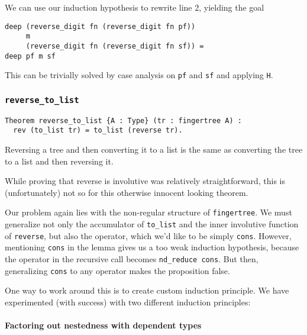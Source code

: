 \documentclass{article}
\newcommand{\code}[1]{\texttt{#1}}
\begin{document}
We can use our induction hypothesis to rewrite line 2, yielding the goal
\begin{verbatim}
deep (reverse_digit fn (reverse_digit fn pf))
     m
     (reverse_digit fn (reverse_digit fn sf)) =
deep pf m sf
\end{verbatim}

This can be trivially solved by case analysis on \code{pf} and \code{sf}
and applying \code{H}.

\subsubsection{\code{reverse\_to\_list}}
\begin{listing}[H]
\begin{verbatim}
Theorem reverse_to_list {A : Type} (tr : fingertree A) :
  rev (to_list tr) = to_list (reverse tr).
\end{verbatim}
\caption{Reversing a tree and then converting it to a list is the same
         as converting the tree to a list and then reversing it.}
\label{reverse_to_list}
\end{listing}

While proving that reverse is involutive was relatively straightforward, this is
(unfortunately) not so for this otherwise innocent looking theorem.

Our problem again lies with the non-regular structure of \code{fingertree}.
We must generalize not only the accumulator of \code{to\_list} and
the inner involutive function of \code{reverse}, but also the operator, which
we'd like to be simply \code{cons}. However, mentioning \code{cons} in the
lemma gives us a too weak induction hypothesis, because the operator in the
recursive call becomes \code{nd\_reduce cons}. But then, generalizing \code{cons}
to any operator makes the proposition false.

One way to work around this is to create custom induction principle. We have
experimented (with success) with two different induction principles:

\paragraph{Factoring out nestedness with dependent types} \mbox{}\\
\end{document}
